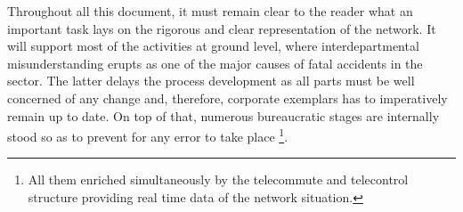 Throughout all this document, it must remain clear to the reader what an important task lays on the rigorous and clear representation of the network. It will support most of the activities at ground level, where interdepartmental misunderstanding erupts as one of the major causes of fatal accidents in the sector. The latter delays the process development as all parts must be well concerned of any change and, therefore, corporate exemplars has to imperatively remain up to date. On top of that, numerous bureaucratic stages are internally stood so as to prevent for any error to take place \footnote{All them enriched simultaneously by the telecommute and telecontrol structure providing real time data of the network situation.}.


